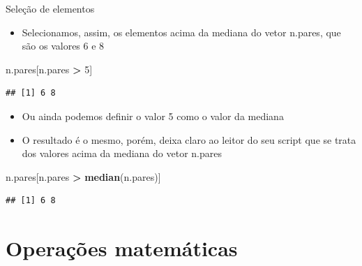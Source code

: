 \documentclass[
  10pt,
  ignorenonframetext,
]{beamer}
\newenvironment{Shaded}{\begin{snugshade}}{\end{snugshade}}
\newcommand{\DecValTok}[1]{\textcolor[rgb]{0.00,0.00,0.81}{#1}}
\newcommand{\KeywordTok}[1]{\textcolor[rgb]{0.13,0.29,0.53}{\textbf{#1}}}
\newcommand{\NormalTok}[1]{#1}
\newcommand{\OperatorTok}[1]{\textcolor[rgb]{0.81,0.36,0.00}{\textbf{#1}}}
\newcommand{\StringTok}[1]{\textcolor[rgb]{0.31,0.60,0.02}{#1}}
\providecommand{\tightlist}{%
  \setlength{\itemsep}{0pt}\setlength{\parskip}{0pt}}
\begin{document}
\begin{frame}[fragile]{Seleção de elementos}
\protect\hypertarget{seleuxe7uxe3o-de-elementos-6}{}
\begin{itemize}
\tightlist
\item
  Selecionamos, assim, os elementos acima da mediana do vetor n.pares,
  que são os valores 6 e 8
\end{itemize}

\begin{Shaded}
\begin{Highlighting}[]
\NormalTok{n.pares[n.pares }\OperatorTok{\textgreater{}}\StringTok{ }\DecValTok{5}\NormalTok{]}
\end{Highlighting}
\end{Shaded}

\begin{verbatim}
## [1] 6 8
\end{verbatim}

\begin{itemize}
\tightlist
\item
  Ou ainda podemos definir o valor 5 como o valor da mediana
\item
  O resultado é o mesmo, porém, deixa claro ao leitor do seu script que
  se trata dos valores acima da mediana do vetor n.pares
\end{itemize}

\begin{Shaded}
\begin{Highlighting}[]
\NormalTok{n.pares[n.pares }\OperatorTok{\textgreater{}}\StringTok{ }\KeywordTok{median}\NormalTok{(n.pares)]}
\end{Highlighting}
\end{Shaded}

\begin{verbatim}
## [1] 6 8
\end{verbatim}
\end{frame}

\hypertarget{operauxe7uxf5es-matemuxe1ticas}{%
\section{Operações matemáticas}\label{operauxe7uxf5es-matemuxe1ticas}}
\end{document}
